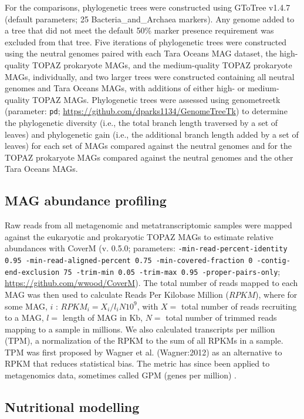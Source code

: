 \documentclass[12pt]{article}
\numberwithin{equation}{section}
\begin{document}
For the comparisons, phylogenetic trees were constructed using GToTree v1.4.7 \citep{Lee_2019} (default parameters; 25 Bacteria\_and\_Archaea markers). Any genome added to a tree that did not meet the default 50\% marker presence requirement was excluded from that tree. Five iterations of phylogenetic trees were constructed using the neutral genomes paired with each Tara Oceans MAG dataset, the high-quality TOPAZ prokaryote MAGs, and the medium-quality TOPAZ prokaryote MAGs, individually, and two larger trees were constructed containing all neutral genomes and Tara Oceans MAGs, with additions of either high- or medium-quality TOPAZ MAGs. Phylogenetic trees were assessed using genometreetk (parameter: \texttt{pd}; \url{https://github.com/dparks1134/GenomeTreeTk}) to determine the phylogenetic diversity (i.e., the total branch length traversed by a set of leaves) and phylogenetic gain (i.e., the additional branch length added by a set of leaves) \citep{Parks2017Recovery} for each set of MAGs compared against the neutral genomes and for the TOPAZ prokaryote MAGs compared against the neutral genomes and the other Tara Oceans MAGs.

\subsection*{MAG abundance profiling} 

Raw reads from all metagenomic and metatranscriptomic samples were mapped against the eukaryotic and prokaryotic TOPAZ MAGs to estimate relative abundances with CoverM (v. 0.5.0; parameters: \texttt{-min-read-percent-identity 0.95 -min-read-aligned-percent 0.75  -min-covered-fraction 0 -contig-end-exclusion 75 -trim-min 0.05 -trim-max 0.95  -proper-pairs-only}; \url{https://github.com/wwood/CoverM}). The total number of reads mapped to each MAG was then used to calculate Reads Per Kilobase Million ($RPKM$), where for some MAG, $i$ :  $RPKM_i = {X_i}/{l_iN}10^9$, with $X =$ total number of reads recruiting to a MAG, $l =$ length of MAG in Kb, $N =$ total number of trimmed reads mapping to a sample in millions. We also calculated transcripts per million (TPM), a normalization of the RPKM to the sum of all RPKMs in a sample. TPM was first proposed by Wagner et al. (Wagner:2012) \citep{Wagner_2012} as an alternative to RPKM that reduces statistical bias. The metric has since been applied to metagenomics data, sometimes called GPM (genes per million) \citep{Gradoville_2017}. 

\subsection*{Nutritional modelling} 
\end{document}
